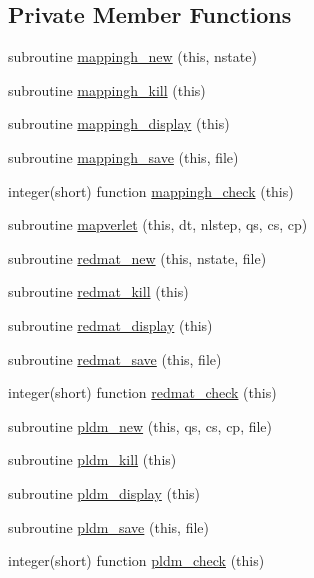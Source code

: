 \subsection*{Private Member Functions}
\begin{DoxyCompactItemize}
\item 
subroutine \hyperlink{classldm__class_a233670656d355fd777ff6399acec2acb}{mappingh\+\_\+new} (this, nstate)
\item 
subroutine \hyperlink{classldm__class_a89385a3fecce8aa3ae8d0c7b594fb7a9}{mappingh\+\_\+kill} (this)
\item 
subroutine \hyperlink{classldm__class_af7987796af490df2f7c321ee09b87646}{mappingh\+\_\+display} (this)
\item 
subroutine \hyperlink{classldm__class_a54e57f7f053b49d8447417972553a8ce}{mappingh\+\_\+save} (this, file)
\item 
integer(short) function \hyperlink{classldm__class_af7175f5e209844633be1e9d9df5982cc}{mappingh\+\_\+check} (this)
\item 
subroutine \hyperlink{classldm__class_a74b06c9591f904a42ea82b7218984a0c}{mapverlet} (this, dt, nlstep, qs, cs, cp)
\item 
subroutine \hyperlink{classldm__class_a73f19e5e8dc0db7f711060d15f0758ee}{redmat\+\_\+new} (this, nstate, file)
\item 
subroutine \hyperlink{classldm__class_a2460f4ad2ec98bda3dce8b992ed88a44}{redmat\+\_\+kill} (this)
\item 
subroutine \hyperlink{classldm__class_aaef8a36368869d879e247ea5abd39dab}{redmat\+\_\+display} (this)
\item 
subroutine \hyperlink{classldm__class_a52cd911f4bfe5cf3fb751791b1590e92}{redmat\+\_\+save} (this, file)
\item 
integer(short) function \hyperlink{classldm__class_acc6a237673894a2d0a1d926477d2ebea}{redmat\+\_\+check} (this)
\item 
subroutine \hyperlink{classldm__class_a95d2afa2bf84dc065a5f805376546732}{pldm\+\_\+new} (this, qs, cs, cp, file)
\item 
subroutine \hyperlink{classldm__class_a5c5f910b4eef4a860fe6df8c144ab46e}{pldm\+\_\+kill} (this)
\item 
subroutine \hyperlink{classldm__class_aa6b4c80dc13e056ed9b37d3607b670d5}{pldm\+\_\+display} (this)
\item 
subroutine \hyperlink{classldm__class_a95c733ee81b1cbc8b21a0b6201227ee0}{pldm\+\_\+save} (this, file)
\item 
integer(short) function \hyperlink{classldm__class_a35a0e843d8b83782d1e93f1f462a3978}{pldm\+\_\+check} (this)

\end{DoxyCompactItemize}
